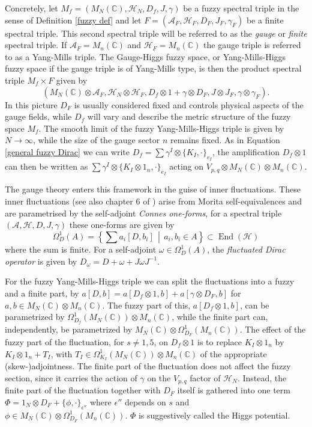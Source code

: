 \documentclass[10pt]{article}
\DeclareMathOperator{\End}{End}
\begin{document}
Concretely, let $M_f = (M_N(\mathbb{C}), \mathcal{H}_N, D_f, J, \gamma)$ be a fuzzy spectral triple in the sense of Definition \ref{fuzzy def} and let $F = (\mathcal{A}_F, \mathcal{H}_F, D_F, J_F, \gamma_F)$ be a finite spectral triple.
This second spectral triple will be referred to as the \textit{gauge} or \textit{finite} spectral triple.
If $\mathcal{A}_F = M_n(\mathbb{C})$ and $\mathcal{H}_F = M_n(\mathbb{C})$ the gauge triple is referred to as a Yang-Mills triple.
The Gauge-Higgs fuzzy space, or Yang-Mills-Higgs fuzzy space if the gauge triple is of Yang-Mills type, is then the product spectral triple $M_f \times F$  given by
$$
  \left(M_N(\mathbb{C}) \otimes \mathcal{A}_F, \mathcal{H}_N \otimes \mathcal{H}_F, D_f \otimes 1 + \gamma \otimes D_F, J \otimes J_F, \gamma \otimes \gamma_F\right).
$$
In this picture $D_F$ is usually considered fixed and controls physical aspects of the gauge fields, while $D_f$ will vary and describe the metric structure of the fuzzy space $M_f$.
The smooth limit of the fuzzy Yang-Mills-Higgs triple is given by $N \to \infty$, while the size of the gauge sector $n$ remains fixed.
As in Equation \ref{general fuzzy Dirac} we can write $D_f = \sum \gamma^I \otimes \{K_I, \cdot\}_{e_I}$, the amplification $D_f \otimes 1$ can then be written as $\sum \gamma^I \otimes \{K_I \otimes 1_n, \cdot\}_{e_I}$ acting on $V_{p, q} \otimes M_N(\mathbb{C}) \otimes M_n(\mathbb{C})$.

The gauge theory enters this framework in the guise of inner fluctuations.
These inner fluctuations \cite{Connes Inner Fluctuations} (see also chapter 6 of \cite{VS}) arise from Morita self-equivalences and are parametrised by the self-adjoint \textit{Connes one-forms}, for a spectral triple $(\mathcal{A}, \mathcal{H}, D, J, \gamma)$ these one-forms are given by
$$
  \Omega^1_D(A) = \left\{ \sum a_i[D, b_i] \,\middle|\, a_i, b_i \in A\right\} \subset \End(\mathcal{H})
$$
where the sum is finite.
For a self-adjoint $\omega \in \Omega^1_D(A)$, the \textit{fluctuated Dirac operator} is given by $D_\omega = D + \omega + J \omega J^{-1}$.

For the fuzzy Yang-Mills-Higgs triple we can split the fluctuations into a fuzzy and a finite part, by $a[D, b] = a[D_f \otimes 1, b] + a[\gamma \otimes D_F, b]$ for $a, b \in M_N(\mathbb{C}) \otimes M_n(\mathbb{C})$.
The fuzzy part of this, $a[D_f \otimes 1, b]$, can be parametrized by $\Omega^1_{D_f}(M_N(\mathbb{C})) \otimes M_n(\mathbb{C})$, while the finite part can, independently, be parametrized by $M_N(\mathbb{C}) \otimes \Omega^1_{D_F}(M_{n}(\mathbb{C}))$.
The effect of the fuzzy part of the fluctuation, for $s \neq 1, 5$, on $D_f \otimes 1$ is to replace $K_I \otimes 1_n$ by $K_I \otimes 1_n + T_I$, with $T_I \in \Omega^1_{K_I}(M_N(\mathbb{C})) \otimes M_n(\mathbb{C})$ of the appropriate (skew-)adjointness.
The finite part of the fluctuation does not affect the fuzzy section, since it carries the action of $\gamma$ on the $V_{p, q}$ factor of $\mathcal{H}_N$.
Instead, the finite part of the fluctuation together with $D_F$ itself is gathered into one term $\Phi = 1_N \otimes D_F + \{\phi, \cdot \}_{\epsilon''}$ where $\epsilon''$ depends on $s$ and $\phi \in M_N(\mathbb{C}) \otimes \Omega^1_{D_F}(M_n(\mathbb{C}))$. $\Phi$ is suggestively called the Higgs potential.
\end{document}
